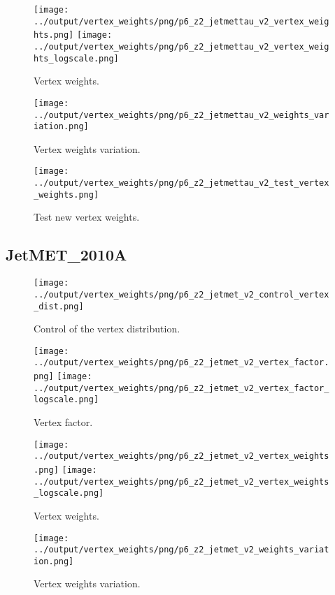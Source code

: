 \documentclass[11pt]{book}
\begin{document}
\begin{figure}[ht]
\centering
\texttt{[image: ../output/vertex\_weights/png/p6\_z2\_jetmettau\_v2\_vertex\_weights.png]}
\texttt{[image: ../output/vertex\_weights/png/p6\_z2\_jetmettau\_v2\_vertex\_weights\_logscale.png]}
\caption{Vertex weights.}
\end{figure}

\begin{figure}[ht]
\centering
\texttt{[image: ../output/vertex\_weights/png/p6\_z2\_jetmettau\_v2\_weights\_variation.png]}
\caption{Vertex weights variation.}
\end{figure}

\begin{figure}[ht]
\centering
\texttt{[image: ../output/vertex\_weights/png/p6\_z2\_jetmettau\_v2\_test\_vertex\_weights.png]}
\caption{Test new vertex weights.}
\end{figure}
\clearpage

\subsection{JetMET\_2010A}
\begin{figure}[ht]
\centering
\texttt{[image: ../output/vertex\_weights/png/p6\_z2\_jetmet\_v2\_control\_vertex\_dist.png]}
\caption{Control of the vertex distribution.}
\end{figure}

\begin{figure}[ht]
\centering
\texttt{[image: ../output/vertex\_weights/png/p6\_z2\_jetmet\_v2\_vertex\_factor.png]}
\texttt{[image: ../output/vertex\_weights/png/p6\_z2\_jetmet\_v2\_vertex\_factor\_logscale.png]}
\caption{Vertex factor.}
\end{figure}

\begin{figure}[ht]
\centering
\texttt{[image: ../output/vertex\_weights/png/p6\_z2\_jetmet\_v2\_vertex\_weights.png]}
\texttt{[image: ../output/vertex\_weights/png/p6\_z2\_jetmet\_v2\_vertex\_weights\_logscale.png]}
\caption{Vertex weights.}
\end{figure}

\begin{figure}[ht]
\centering
\texttt{[image: ../output/vertex\_weights/png/p6\_z2\_jetmet\_v2\_weights\_variation.png]}
\caption{Vertex weights variation.}
\end{figure}
\end{document}
